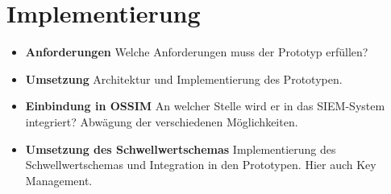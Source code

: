 \chapter{Implementierung}


\begin{itemize}
  \item \textbf{Anforderungen} Welche Anforderungen muss der Prototyp erfüllen?
  \item \textbf{Umsetzung} Architektur und Implementierung des Prototypen.
  \item \textbf{Einbindung in OSSIM} An welcher Stelle wird er in das SIEM-System integriert? Abwägung der verschiedenen Möglichkeiten.
  \item \textbf{Umsetzung des Schwellwertschemas} Implementierung des Schwellwertschemas und Integration in den Prototypen. Hier auch Key Management.
\end{itemize}


\label{cha_implementation}




























